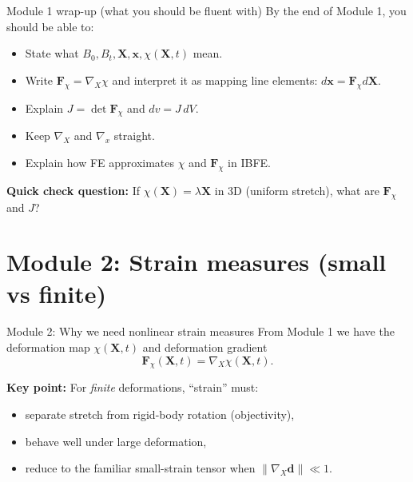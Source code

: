 \documentclass[aspectratio=169]{beamer}
\newcommand{\x}{\bm{x}}
\newcommand{\X}{\bm{X}}
\newcommand{\gradx}{\nabla_{\!x}}
\newcommand{\gradX}{\nabla_{\!X}}
\newcommand{\Fdef}{\bm{F}_{\chi}}  %
\begin{document}
\begin{frame}{Module 1 wrap-up (what you should be fluent with)}
\small
By the end of Module 1, you should be able to:
\begin{itemize}
\item State what \(B_0, B_t, \X, \x, \chi(\X,t)\) mean.
\item Write \(\Fdef=\gradX \chi\) and interpret it as mapping line elements: \(d\x=\Fdef d\X\).
\item Explain \(J=\det\Fdef\) and \(dv = J\,dV\).
\item Keep \(\gradX\) and \(\gradx\) straight.
\item Explain how FE approximates \(\chi\) and \(\Fdef\) in IBFE.
\end{itemize}

\medskip
\textbf{Quick check question:} If \(\chi(\X)=\lambda \X\) in 3D (uniform stretch), what are \(\Fdef\) and \(J\)?
\end{frame}

\section{Module 2: Strain measures (small vs finite)}

\begin{frame}{Module 2: Why we need nonlinear strain measures}
\small
From Module 1 we have the deformation map \(\chi(\X,t)\) and deformation gradient
\[
\Fdef(\X,t)=\gradX \chi(\X,t).
\]

\medskip
\textbf{Key point:} For \emph{finite} deformations, ``strain'' must:
\begin{itemize}
\item separate stretch from rigid-body rotation (objectivity),
\item behave well under large deformation,
\item reduce to the familiar small-strain tensor when \(\|\gradX \bm{d}\|\ll 1\).
\end{itemize}

\end{frame}
\end{document}
